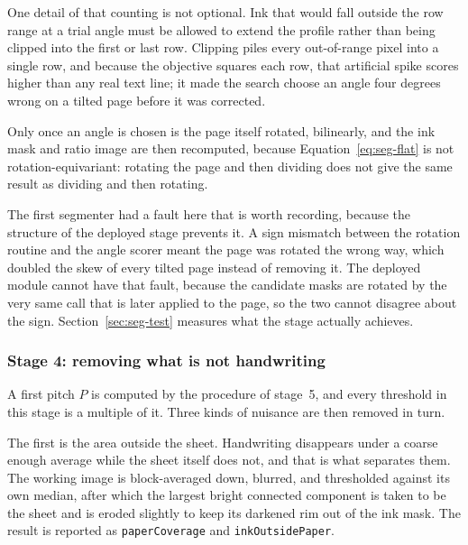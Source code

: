 One detail of that counting is not optional. Ink that would fall outside the row range at a trial angle must be allowed to extend the profile rather than being clipped into the first or last row. Clipping piles every out-of-range pixel into a single row, and because the objective squares each row, that artificial spike scores higher than any real text line; it made the search choose an angle four degrees wrong on a tilted page before it was corrected.

Only once an angle is chosen is the page itself rotated, bilinearly, and the ink mask and ratio image are then recomputed, because Equation~\ref{eq:seg-flat} is not rotation-equivariant: rotating the page and then dividing does not give the same result as dividing and then rotating.

The first segmenter had a fault here that is worth recording, because the structure of the deployed stage prevents it. A sign mismatch between the rotation routine and the angle scorer meant the page was rotated the wrong way, which doubled the skew of every tilted page instead of removing it. The deployed module cannot have that fault, because the candidate masks are rotated by the very same call that is later applied to the page, so the two cannot disagree about the sign. Section~\ref{sec:seg-test} measures what the stage actually achieves.

\subsubsection{Stage 4: removing what is not handwriting}

A first pitch $P$ is computed by the procedure of stage~5, and every threshold in this stage is a multiple of it. Three kinds of nuisance are then removed in turn.

The first is the area outside the sheet. Handwriting disappears under a coarse enough average while the sheet itself does not, and that is what separates them. The working image is block-averaged down, blurred, and thresholded against its own median, after which the largest bright connected component is taken to be the sheet and is eroded slightly to keep its darkened rim out of the ink mask. The result is reported as \texttt{paperCoverage} and \texttt{inkOutsidePaper}.

